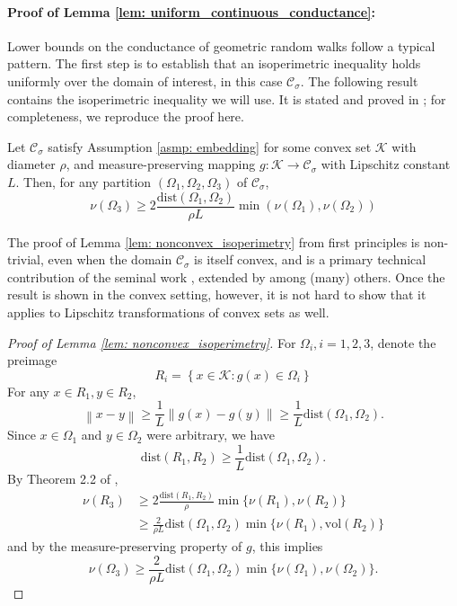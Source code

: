\documentclass[11pt,twoside]{article}
\newcommand{\set}[1]{\left\{#1\right\}}
\newcommand{\vol}{\mathrm{vol}}
\newcommand{\norm}[1]{\left\lVert#1\right\rVert}
\newcommand{\1}{\mathbbm{1}}
\newcommand{\dist}{\mathrm{dist}}
\newcommand{\Cset}{\mathcal{C}}
\newcommand{\Csig}{\Cset_{\sigma}}
\begin{document}
\paragraph{Proof of Lemma \ref{lem: uniform_continuous_conductance}:}
Lower bounds on the conductance of geometric random walks follow a typical pattern. The first step is to establish that an isoperimetric inequality holds uniformly over the domain of interest, in this case $\Csig$. The following result contains the isoperimetric inequality we will use. It is stated and proved in \cite{abbasi-yadkori2016a}; for completeness, we reproduce the proof here.
\begin{lemma}
	\label{lem: nonconvex_isoperimetry}
	Let $\Csig$ satisfy Assumption \ref{asmp: embedding} for some convex set $\mathcal{K}$ with diameter $\rho$, and measure-preserving mapping $g: \mathcal{K} \to \Csig$ with Lipschitz constant $L$. Then, for any partition $(\Omega_1,\Omega_2,\Omega_3)$ of $\Csig$, 
	\begin{equation*}
	\nu(\Omega_3) \geq 2\frac{\dist(\Omega_1, \Omega_2)}{\rho L} \min(\nu(\Omega_1), \nu(\Omega_2))
	\end{equation*}
\end{lemma}
The proof of Lemma \ref{lem: nonconvex_isoperimetry} from first principles is non-trivial, even when the domain $\Csig$ is itself convex, and is a primary technical contribution of the seminal work \cite{lovasz1990}, extended by \cite{dyer1991} among (many) others. Once the result is shown in the convex setting, however, it is not hard to show that it applies to Lipschitz transformations of convex sets as well.
\begin{proof}[Proof of Lemma \ref{lem: nonconvex_isoperimetry}]
	For $\Omega_i, i = 1,2,3$, denote the preimage
	\begin{equation*}
	R_i = \set{x \in \mathcal{K}: g(x) \in \Omega_i}
	\end{equation*}
	For any $x \in R_1, y \in R_2$, 
	\begin{equation*}
	\norm{x - y} \geq \frac{1}{L}\norm{g(x) - g(y)} \geq \frac{1}{L} \dist(\Omega_1, \Omega_2). 
	\end{equation*}
	Since $x \in \Omega_1$ and $y \in \Omega_2$ were arbitrary, we have
	\begin{equation*}
	\dist(R_1, R_2) \geq \frac{1}{L} \dist(\Omega_1, \Omega_2).
	\end{equation*}
	By Theorem 2.2 of \cite{lovasz1990},
	\begin{align*}
	\nu(R_3) & \geq 2\frac{\dist(R_1, R_2)}{\rho} \min \{\nu(R_1), \nu(R_2)\} \\
	& \geq \frac{2}{\rho L} \dist(\Omega_1, \Omega_2) \min\{\nu(R_1), \vol(R_2)\}
	\end{align*}
	and by the measure-preserving property of $g$, this implies
	\begin{equation*}
	\nu(\Omega_3) \geq\frac{2}{\rho L} \dist(\Omega_1, \Omega_2) \min\{\nu(\Omega_1), \nu(\Omega_2)\}.
	\end{equation*}
\end{proof}
\end{document}
